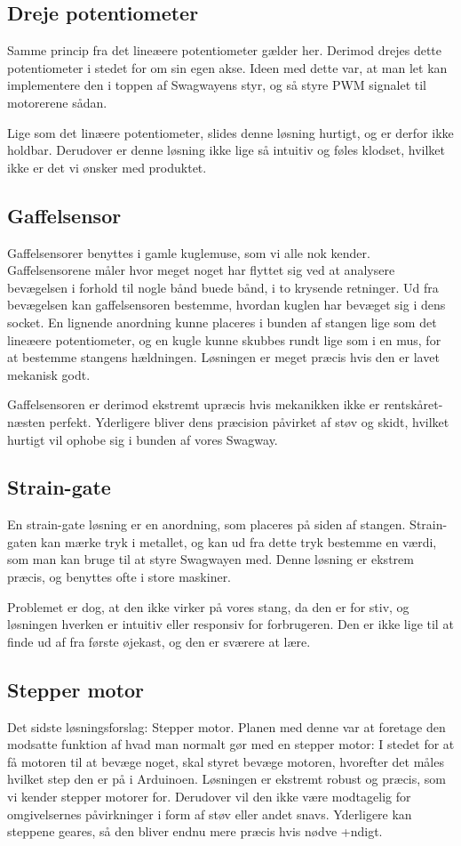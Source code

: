 \documentclass[a4paper,11pt,oneside,article,danish,table]{memoir}
\begin{document}
\subsection{Dreje potentiometer}
Samme princip fra det lineæere potentiometer gælder her. Derimod drejes dette potentiometer i stedet for om sin egen akse. Ideen med dette var, at man let kan implementere den i toppen af Swagwayens styr, og så styre PWM signalet til motorerene sådan. 

Lige som det linæere potentiometer, slides denne løsning hurtigt, og er derfor ikke holdbar. Derudover er denne løsning ikke lige så intuitiv og føles klodset, hvilket ikke er det vi ønsker med produktet.
\subsection{Gaffelsensor}
Gaffelsensorer benyttes i gamle kuglemuse, som vi alle nok kender. Gaffelsensorene måler hvor meget noget har flyttet sig ved at analysere bevægelsen i forhold til nogle bånd buede bånd, i to krysende retninger. Ud fra bevægelsen kan gaffelsensoren bestemme, hvordan kuglen har bevæget sig i dens socket. En lignende anordning kunne placeres i bunden af stangen lige som det lineæere potentiometer, og en kugle kunne skubbes rundt lige som i en mus, for at bestemme stangens hældningen. Løsningen er meget præcis hvis den er lavet mekanisk godt.

Gaffelsensoren er derimod ekstremt upræcis hvis mekanikken ikke er rentskåret-næsten perfekt. Yderligere bliver dens præcision påvirket af støv og skidt, hvilket hurtigt vil ophobe sig i bunden af vores Swagway.
\subsection{Strain-gate}
En strain-gate løsning er en anordning, som placeres på siden af stangen. Strain-gaten kan mærke tryk i metallet, og kan ud fra dette tryk bestemme en værdi, som man kan bruge til at styre Swagwayen med. Denne løsning er ekstrem præcis, og benyttes ofte i store maskiner.

Problemet er dog, at den ikke virker på vores stang, da den er for stiv, og løsningen hverken er intuitiv eller responsiv for forbrugeren. Den er ikke lige til at finde ud af fra første øjekast, og den er sværere at lære.
\subsection{Stepper motor}
Det sidste løsningsforslag: Stepper motor. Planen med denne var at foretage den modsatte funktion af hvad man normalt gør med en stepper motor: I stedet for at få motoren til at bevæge noget, skal styret bevæge motoren, hvorefter det måles hvilket step den er på i Arduinoen. Løsningen er ekstremt robust og præcis, som vi kender stepper motorer for. Derudover vil den ikke være modtagelig for omgivelsernes påvirkninger i form af støv eller andet snavs. Yderligere kan steppene geares, så den bliver endnu mere præcis hvis nødve
+ndigt.
\end{document}
